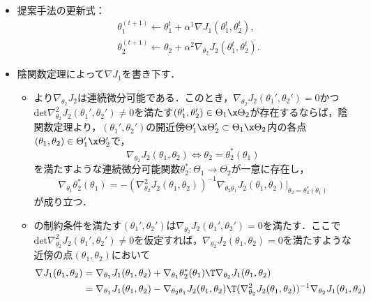 \documentclass[a4paper,10pt,dvipdfmx]{jsarticle}
\begin{document}
\begin{itemize}
    \item 提案手法の更新式：
    \begin{subequations}
    \begin{align}
        &\theta_1^{(t+1)}\gets \theta_1^t+\alpha^1\nabla J_1(\theta_1^t,\theta_2^t),\\
        &\theta_2^{(t+1)}\gets \theta_2+\alpha^2\nabla_{\theta_2} J_2(\theta_1^t,\theta_2^t).
    \end{align}
    \end{subequations}
    \item 陰関数定理によって$\nabla J_1$を書き下す．
    \begin{itemize}
        \item {}より$\nabla_{\theta_2}J_2$は連続微分可能である．このとき，$\nabla_{\theta_2}J_2(\theta_1',\theta_2')=0$かつ$\mathrm{det}\nabla_{\theta_2}^2J_2(\theta_1',\theta_2')\neq 0$を満たす$(\theta_1',\theta_2')\in\Theta_1\x\Theta_2$が存在するならば，陰関数定理より，$(\theta_1',\theta_2')$の開近傍$\Theta_1'\x\Theta_2'\subset\Theta_1\x\Theta_2$内の各点$(\theta_1,\theta_2)\in\Theta_1'\x\Theta_2'$で，
        $$\nabla_{\theta_2}J_2(\theta_1,\theta_2)\iff \theta_2=\theta_2^*(\theta_1)$$
        を満たすような連続微分可能関数$\theta_2^*:\Theta_1\to\Theta_2$が一意に存在し，
        $$\nabla_{\theta_1}\theta_2^*(\theta_1)=-(\nabla_{\theta_2}^2J_2(\theta_1,\theta_2))^{-1}\nabla_{\theta_2\theta_1}J_2(\theta_1,\theta_2)|_{\theta_2=\theta_2^*(\theta_1)}$$
        が成り立つ．
        \item {}の制約条件を満たす$(\theta_1',\theta_2')$は$\nabla_{\theta_2}J_2(\theta_1',\theta_2')=0$を満たす．ここで$\mathrm{det}\nabla_{\theta_2}^2J_2(\theta_1',\theta_2')\neq 0$を仮定すれば，$\nabla_{\theta_2}J_2(\theta_1,\theta_2)=0$を満たすような近傍の点$(\theta_1,\theta_2)$において
        \begin{subequations}
        \begin{align}
            \nabla J_1(\theta_1,\theta_2)&=\nabla_{\theta_1}J_1(\theta_1,\theta_2)+\nabla_{\theta_1}\theta_2^*(\theta_1)\T\nabla_{\theta_2}J_1(\theta_1,\theta_2)\\
            &=\nabla_{\theta_1}J_1(\theta_1,\theta_2)-\nabla_{\theta_2\theta_1}J_2(\theta_1,\theta_2)\T(\nabla_{\theta_2}^2J_2(\theta_1,\theta_2))^{-1}\nabla_{\theta_2}J_1(\theta_1,\theta_2)\label{eq:nabla_J_1_implicit}
    \end{align}
    \end{subequations}

\end{itemize}
\end{itemize}
\end{document}
